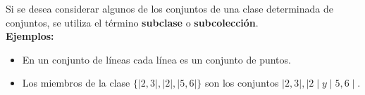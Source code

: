
\noindent    Si se desea considerar algunos de los conjuntos de una clase determinada de conjuntos, se utiliza el término \textbf{subclase} o \textbf{subcolecci\'on}.\\

    \textbf{Ejemplos:}
    \begin{itemize}
         \item  En un conjunto de líneas cada línea es un conjunto de puntos. 
        \item  Los miembros de la clase $\lbrace \mid2,3\mid, \mid2\mid, \mid5,6\mid\rbrace$ son los conjuntos $\mid2,3\mid, \mid2\mid y \mid5,6\mid.$
    \end{itemize}